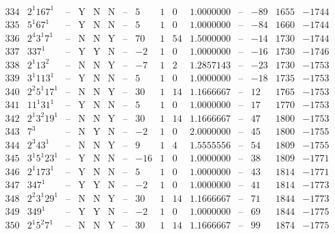 \documentclass[11pt,reqno,a4letter]{article}
\numberwithin{figure}{section}
\numberwithin{table}{section}
\theoremstyle{plain}
\numberwithin{theorem}{section}
\theoremstyle{definition}
\begin{document}
\begin{table}[h!]
\begin{equation*}
{\begin{array}{|cc|c|ccc|c|c|ccc|c|ccc}
 334 & 2^1 167^1 & \text{--} & \text{Y} & \text{N} & \text{N} & \text{--} & 5 & 1 & 0 & 1.0000000 & \text{--} & -89 & 1655 & -1744 \\
 335 & 5^1 67^1 & \text{--} & \text{Y} & \text{N} & \text{N} & \text{--} & 5 & 1 & 0 & 1.0000000 & \text{--} & -84 & 1660 & -1744 \\
 336 & 2^4 3^1 7^1 & \text{--} & \text{N} & \text{N} & \text{Y} & \text{--} & 70 & 1 & 54 & 1.5000000 & \text{--} & -14 & 1730 & -1744 \\
 337 & 337^1 & \text{--} & \text{Y} & \text{Y} & \text{N} & \text{--} & -2 & 1 & 0 & 1.0000000 & \text{--} & -16 & 1730 & -1746 \\
 338 & 2^1 13^2 & \text{--} & \text{N} & \text{N} & \text{Y} & \text{--} & -7 & 1 & 2 & 1.2857143 & \text{--} & -23 & 1730 & -1753 \\
 339 & 3^1 113^1 & \text{--} & \text{Y} & \text{N} & \text{N} & \text{--} & 5 & 1 & 0 & 1.0000000 & \text{--} & -18 & 1735 & -1753 \\
 340 & 2^2 5^1 17^1 & \text{--} & \text{N} & \text{N} & \text{Y} & \text{--} & 30 & 1 & 14 & 1.1666667 & \text{--} & 12 & 1765 & -1753 \\
 341 & 11^1 31^1 & \text{--} & \text{Y} & \text{N} & \text{N} & \text{--} & 5 & 1 & 0 & 1.0000000 & \text{--} & 17 & 1770 & -1753 \\
 342 & 2^1 3^2 19^1 & \text{--} & \text{N} & \text{N} & \text{Y} & \text{--} & 30 & 1 & 14 & 1.1666667 & \text{--} & 47 & 1800 & -1753 \\
 343 & 7^3 & \text{--} & \text{N} & \text{Y} & \text{N} & \text{--} & -2 & 1 & 0 & 2.0000000 & \text{--} & 45 & 1800 & -1755 \\
 344 & 2^3 43^1 & \text{--} & \text{N} & \text{N} & \text{Y} & \text{--} & 9 & 1 & 4 & 1.5555556 & \text{--} & 54 & 1809 & -1755 \\
 345 & 3^1 5^1 23^1 & \text{--} & \text{Y} & \text{N} & \text{N} & \text{--} & -16 & 1 & 0 & 1.0000000 & \text{--} & 38 & 1809 & -1771 \\
 346 & 2^1 173^1 & \text{--} & \text{Y} & \text{N} & \text{N} & \text{--} & 5 & 1 & 0 & 1.0000000 & \text{--} & 43 & 1814 & -1771 \\
 347 & 347^1 & \text{--} & \text{Y} & \text{Y} & \text{N} & \text{--} & -2 & 1 & 0 & 1.0000000 & \text{--} & 41 & 1814 & -1773 \\
 348 & 2^2 3^1 29^1 & \text{--} & \text{N} & \text{N} & \text{Y} & \text{--} & 30 & 1 & 14 & 1.1666667 & \text{--} & 71 & 1844 & -1773 \\
 349 & 349^1 & \text{--} & \text{Y} & \text{Y} & \text{N} & \text{--} & -2 & 1 & 0 & 1.0000000 & \text{--} & 69 & 1844 & -1775 \\
 350 & 2^1 5^2 7^1 & \text{--} & \text{N} & \text{N} & \text{Y} & \text{--} & 30 & 1 & 14 & 1.1666667 & \text{--} & 99 & 1874 & -1775 \\
\end{array}
}
\end{equation*}

\end{table} 
\end{document}
